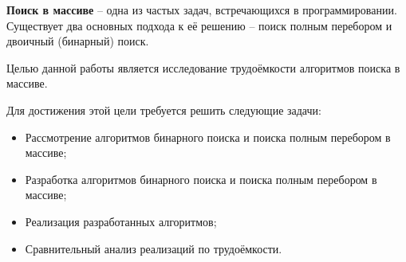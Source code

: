 
\textbf{Поиск в массиве} – одна из частых задач, встречающихся в программировании. Существует два основных подхода к её решению – поиск полным перебором и двоичный (бинарный) поиск.

Целью данной работы является исследование трудоёмкости алгоритмов поиска в массиве.

Для достижения этой цели требуется решить следующие задачи:

\begin{itemize}
	\item Рассмотрение алгоритмов бинарного поиска и поиска полным перебором в массиве;
	\item Разработка алгоритмов бинарного поиска и поиска полным перебором в массиве;
	\item Реализация разработанных алгоритмов;
	\item Сравнительный анализ реализаций по трудоёмкости. 
\end{itemize}

\newpage

\clearpage
